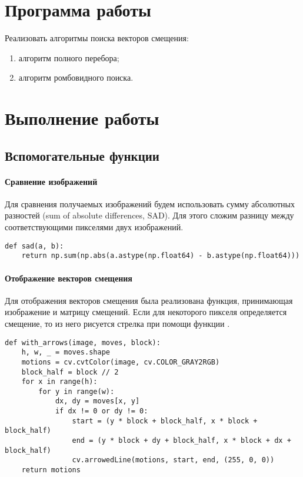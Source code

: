





\tableofcontents
\newpage

\section{Программа работы}

Реализовать алгоритмы поиска векторов смещения:

\begin{enumerate}
	\item алгоритм полного перебора;
	\item алгоритм ромбовидного поиска.
\end{enumerate}

\section{Выполнение работы}

\subsection{Вспомогательные функции}

\paragraph{Сравнение изображений}

Для сравнения получаемых изображений будем использовать сумму абсолютных разностей (sum of absolute differences, SAD). Для этого сложим разницу между соответствующими пикселями двух изображений.

\begin{lstlisting}[caption={Фунукция для сравнения изображений}]
def sad(a, b):
	return np.sum(np.abs(a.astype(np.float64) - b.astype(np.float64)))
\end{lstlisting}

\paragraph{Отображение векторов смещения}

Для отображения векторов смещения была реализована функция, принимающая изображение и матрицу смещений. Если для некоторого пикселя определяется смещение, то из него рисуется стрелка при помощи функции .

\begin{lstlisting}[caption={Фунукция для сравнения изображений}]
def with_arrows(image, moves, block):
	h, w, _ = moves.shape
	motions = cv.cvtColor(image, cv.COLOR_GRAY2RGB)
	block_half = block // 2
	for x in range(h):
		for y in range(w):
			dx, dy = moves[x, y]
			if dx != 0 or dy != 0:
				start = (y * block + block_half, x * block + block_half)
				end = (y * block + dy + block_half, x * block + dx + block_half)
				cv.arrowedLine(motions, start, end, (255, 0, 0))
	return motions
\end{lstlisting}


